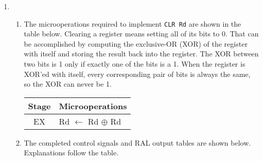\documentclass[11pt]{article}
\begin{document}
\begin{enumerate}[leftmargin=0.2in]

\item
  \begin{enumerate}
    \item The microoperations required to implement \texttt{CLR Rd} are shown in the table below. Clearing a register means setting all of its bits to 0. That can be accomplished by computing the exclusive-OR (XOR) of the register with itself and storing the result back into the register. The XOR between two bits is 1 only if exactly one of the bits is a 1. When the register is XOR'ed with itself, every corresponding pair of bits is always the same, so the XOR can never be 1.
      \begin{table}[H]
        \centering
        \begin{tabular}{|c|l|} \hline
          Stage & \multicolumn{1}{c|}{Microoperations} \\ \hline
          EX    & Rd $\leftarrow$ Rd $\oplus$ Rd \\ \hline
        \end{tabular}
        \label{tab:1a}
      \end{table}

    \item The completed control signals and RAL output tables are shown below. Explanations follow the table.


\end{enumerate}
\end{enumerate}
\end{document}
